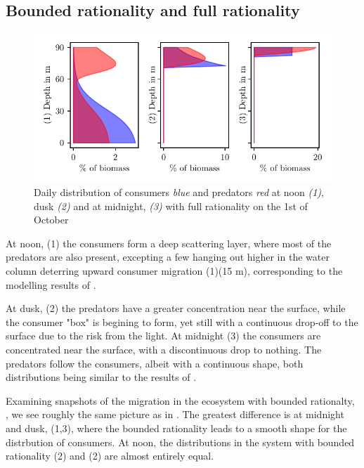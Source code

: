 \subsection*{Bounded rationality and full rationality}
\begin{figure}[H]
\includegraphics{plots/specific_dists_rational.pdf}
\caption{Daily distribution of consumers \emph{blue} and predators \emph{red} at noon \emph{(1)}, dusk \emph{(2)} and at midnight, \emph{(3)} with full rationality on the 1st of October}
\label{fig:both_specific_dists.pdf}
\end{figure}
At noon, (1) the consumers form a deep scattering layer, where most of the predators are also present, excepting a few hanging out higher in the water column deterring upward consumer migration (1)(15 m), corresponding to the modelling results of \citep{jerome}.

At dusk, (2) the predators have a greater concentration near the surface, while the consumer "box" is begining to form, yet still with a continuous drop-off to the surface due to the risk from the light.
At midnight (3) the consumers are concentrated near the surface, with a discontinuous drop to nothing. The predators follow the consumers, albeit with a continuous shape, both distributions being similar to the results of \citep{verticalmigration}.

Examining snapshots of the migration in the ecosystem with bounded rationalty, , we see roughly the same picture as in . The greatest difference is at midnight and dusk, (1,3), where the bounded rationality leads to a smooth shape for the distrbution of consumers. At noon, the distributions in the system with bounded rationality (2) and (2) are almost entirely equal.

